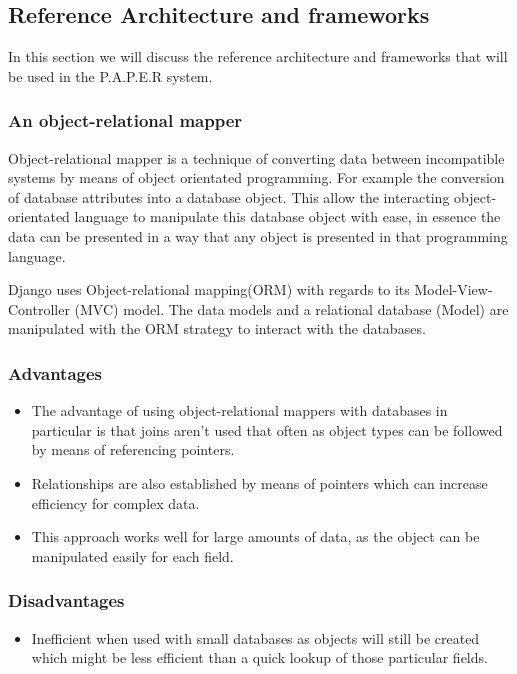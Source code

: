\documentclass{article}
\begin{document}
		\subsection{Reference Architecture and frameworks}\label{sec: ReferencArchitecture}
In this section we will discuss the reference architecture and frameworks that will be used in the P.A.P.E.R system.
	\subsubsection{An object-relational mapper}\label{subsec: ORM}
	Object-relational mapper is a technique of converting data between incompatible systems by means of object orientated programming. For example the conversion of database attributes into a database object. This allow the interacting object-orientated language to manipulate this database object with ease, in essence the data can be presented in a way that any object is presented in that programming language.
	
	Django uses Object-relational mapping(ORM) with regards to its Model-View-Controller (MVC) model.
	The data models and a relational database (Model) are manipulated with the ORM strategy to interact with the databases.
		
	
	\subsubsection{Advantages}
	\begin{itemize}
	\item
	The advantage of using object-relational mappers with databases in particular is that joins aren't used that often as object types can be followed by means of referencing pointers. 
	\item
	Relationships are also established by means of pointers which can increase efficiency for complex data.
	\item
	This approach works well for large amounts of data, as the object can be manipulated easily for each field.
	\end{itemize}
	
	\subsubsection{Disadvantages}
	
	\begin{itemize}
	\item
	 Inefficient when used with small databases as objects will still be created which might be less efficient than a quick lookup of those particular fields. 
	\end{itemize}
	
\end{document}
